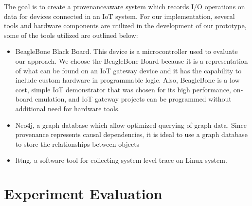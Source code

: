 The goal is to create a provenance\-aware system which records I/O operations on data for devices connected in an IoT system. For our implementation, several tools and hardware components are utilized in the development of our prototype, some of the tools utilized are outlined below:

\begin{itemize}
\item BeagleBone Black Board. This device is a microcontroller used to evaluate our approach. We choose the BeagleBone Board because it is a representation of what can be found on an IoT gateway device and it has the capability to include custom hardware in programmable logic. Also, BeagleBone is a low cost, simple IoT demonstrator that was chosen for its high performance, on­board emulation, and IoT gateway projects can be programmed without additional need for hardware tools.


\item Neo4j, a graph database which allow optimized querying of graph data. Since provenance represents causal dependencies, it is ideal to use a graph database to store the relationships between objects

\item lttng, a software tool for collecting system level trace on Linux system. 

\end{itemize}


\section{Experiment Evaluation}

